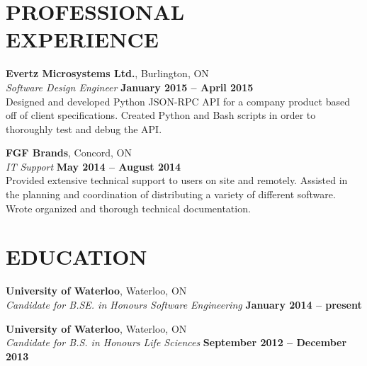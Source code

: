 \documentclass[margin,line]{resume}
\begin{document}
\begin{resume}
\sectionline\vspace{1mm}

    \section{\mysidestyle \textbf{\large{P}\small{ROFESSIONAL\\EXPERIENCE}}}

    \textbf{\listing Evertz Microsystems Ltd.}, Burlington, ON \vspace{2mm}\\\vspace{1mm}%
    \textsl{Software Design Engineer} \hfill \textbf{January 2015 -- April 2015}\\
    Designed and developed Python JSON-RPC API for a company product based off of client specifications. Created Python and Bash scripts in order to thoroughly test and debug the API.

    \textbf{\listing FGF Brands}, Concord, ON \vspace{2mm}\\\vspace{1mm}%
    \textsl{IT Support} \hfill \textbf{May 2014 -- August 2014}\\
    Provided extensive technical support to users on site and remotely. Assisted in the planning and coordination of distributing a variety of different software. Wrote organized and thorough technical documentation.

\sectionline\vspace{1mm}

    \section{\mysidestyle \textbf{\large{E}\small{DUCATION}}}

    \textbf{\listing University of Waterloo}, Waterloo, ON \vspace{2mm}\\\vspace{1mm}%
    \textsl{Candidate for B.SE. in Honours Software Engineering} \hfill \textbf{ January 2014 -- present}\vspace{-3mm}\\\vspace{-1mm}%

    \textbf{\listing University of Waterloo}, Waterloo, ON \vspace{2mm}\\\vspace{1mm}%
    \textsl{Candidate for B.S. in Honours Life Sciences} \hfill \textbf{ September 2012 -- December 2013}\vspace{-3mm}\\\vspace{-1mm}%


\end{resume}
\end{document}
